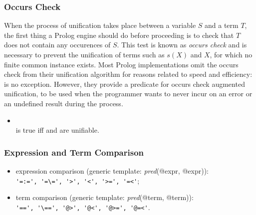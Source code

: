 \subsubsection{Occurs Check}

\noindent When the process of unification takes place between a
variable $S$ and a term $T$, the first thing a Prolog engine should do
before proceeding is to check that $T$ does not contain any occurences
of $S$. This test is known as \emph{occurs check} \cite{ss94} and is
necessary to prevent the unification of terms such as $s(X)$ and $X$,
for which no finite common instance exists. Most Prolog
implementations omit the occurs check from their unification algorithm
for reasons related to speed and efficiency: \tuprolog{} is no
exception. However, they provide a predicate for occurs check
augmented unification, to be used when the programmer wants to never
incur on an error or an undefined result during the process.
%
\begin{itemize}
%
\item {}\\
\noindent{} is true iff 
and  are unifiable.\\
\noindent{}
%
\end{itemize}
%
\subsubsection{Expression and Term Comparison}
\begin{itemize}
%
    \item expression comparison (generic template:
    \emph{pred}(@expr, @expr)):\\
        \verb|'=:=', '=\=', '>', '<', '>=', '=<'|;
    \item term comparison (generic template:
    \emph{pred}(@term, @term)):\\
         \verb|'==', '\==', '@>', '@<', '@>=', '@=<'|.

\end{itemize}

